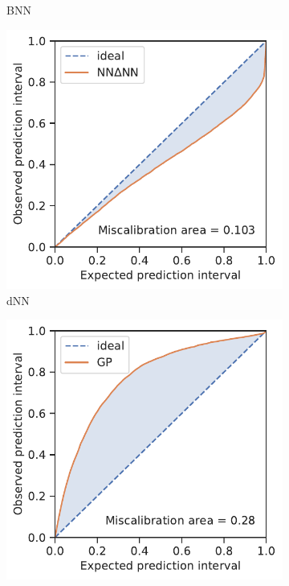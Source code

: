\documentclass[]{achemso}
\begin{document}
\begin{figure}
\begin{subfigure}{0.32\textwidth}
        \caption{\gls{BNN}}\label{fig:calibration_bnn}
    \end{subfigure}
    \begin{subfigure}{0.32\textwidth}
        \includegraphics[width=\textwidth]{../NNdNN/calibration.pdf}
        \caption{\gls{dNN}}\label{fig:calibration_dnn}
    \end{subfigure}
    \begin{subfigure}{0.32\textwidth}
        \includegraphics[width=\textwidth]{../GP/Matern/calibration.pdf}

\end{subfigure}
\end{figure}
\end{document}
